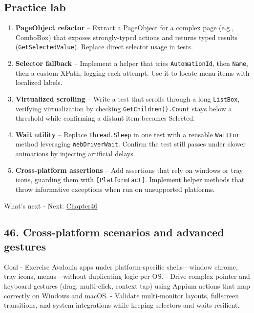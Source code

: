 \subsection{Practice lab}\label{practice-lab-12}

\begin{enumerate}
\def\labelenumi{\arabic{enumi}.}
\tightlist
\item
  \textbf{PageObject refactor} -- Extract a PageObject for a complex
  page (e.g., ComboBox) that exposes strongly-typed actions and returns
  typed results (\passthrough{\lstinline!GetSelectedValue!}). Replace
  direct selector usage in tests.
\item
  \textbf{Selector fallback} -- Implement a helper that tries
  \passthrough{\lstinline!AutomationId!}, then
  \passthrough{\lstinline!Name!}, then a custom XPath, logging each
  attempt. Use it to locate menu items with localized labels.
\item
  \textbf{Virtualized scrolling} -- Write a test that scrolls through a
  long \passthrough{\lstinline!ListBox!}, verifying virtualization by
  checking \passthrough{\lstinline!GetChildren().Count!} stays below a
  threshold while confirming a distant item becomes Selected.
\item
  \textbf{Wait utility} -- Replace
  \passthrough{\lstinline!Thread.Sleep!} in one test with a reusable
  \passthrough{\lstinline!WaitFor!} method leveraging
  \passthrough{\lstinline!WebDriverWait!}. Confirm the test still passes
  under slower animations by injecting artificial delays.
\item
  \textbf{Cross-platform assertions} -- Add assertions that rely on
  windows or tray icons, guarding them with
  \passthrough{\lstinline![PlatformFact]!}. Implement helper methods
  that throw informative exceptions when run on unsupported platforms.
\end{enumerate}

What's next - Next: \href{Chapter46.md}{Chapter46}

\newpage

\subsection{46. Cross-platform scenarios and advanced
gestures}\label{cross-platform-scenarios-and-advanced-gestures}

Goal - Exercise Avalonia apps under platform-specific shells---window
chrome, tray icons, menus---without duplicating logic per OS. - Drive
complex pointer and keyboard gestures (drag, multi-click, context tap)
using Appium actions that map correctly on Windows and macOS. - Validate
multi-monitor layouts, fullscreen transitions, and system integrations
while keeping selectors and waits resilient.

